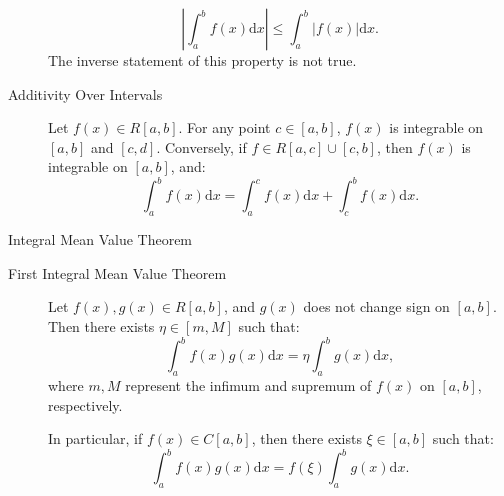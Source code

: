 \documentclass[11pt]{../../TexTemplate/elegantbook}
\begin{document}
\begin{property}
\begin{description}
            \[
            \left| \int_{a}^b f(x) \mathrm{d}x \right| \leqslant \int_{a}^b |f(x)| \mathrm{d}x.
            \]
            The inverse statement of this property is not true.
        \item[Additivity Over Intervals] Let \( f(x) \in R[a, b] \). 
            For any point \( c \in [a, b] \), \( f(x) \) is integrable on \( [a, b] \) and \( [c, d] \). 
            Conversely, if \( f \in R[a, c] \cup [c, b] \), then \( f(x) \) is integrable on \( [a, b] \), and:
            \[
            \int_{a}^b f(x) \mathrm{d}x = \int_{a}^c f(x) \mathrm{d}x + \int_{c}^b f(x) \mathrm{d}x.
            \]
    \end{description}
\end{property}

\begin{theorem}{Integral Mean Value Theorem}
    \begin{description}
        \item[First Integral Mean Value Theorem ] Let \( f(x), g(x) \in R[a, b] \), 
            and \( g(x) \) does not change sign on \( [a, b] \). Then there exists \( \eta \in [m, M] \) such that:
            \[
            \int_{a}^b f(x)g(x) \mathrm{d}x = \eta \int_{a}^b g(x) \mathrm{d}x,
            \]
            where \( m, M \) represent the infimum and supremum of \( f(x) \) on \( [a, b] \), respectively.

            In particular, if \( f(x) \in C[a, b] \), then there exists \( \xi \in [a, b] \) such that:
            \[
            \int_{a}^b f(x)g(x) \mathrm{d}x = f(\xi) \int_{a}^b g(x) \mathrm{d}x.
            \]


\end{description}
\end{theorem}
\end{document}
